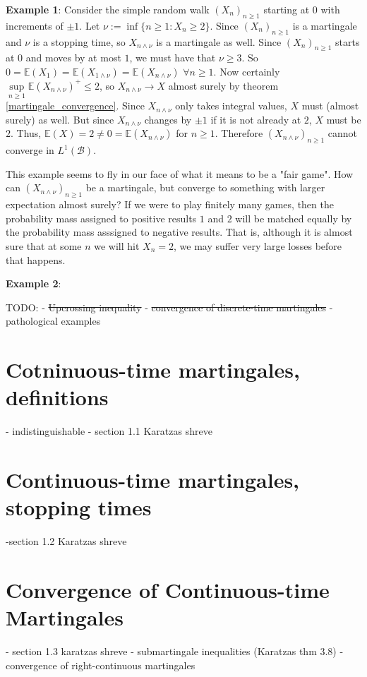 \textbf{Example 1}: Consider the simple random walk $(X_n)_{n \geq 1}$ starting at \(0\) with increments of \(\pm 1\). Let \(\nu := \inf\limits \{n \geq 1 : X_{n} \geq 2\}\). Since \((X_n)_{n \geq 1}\) is a martingale and \(\nu\) is a stopping time, so \(X_{n \wedge \nu}\) is a martingale as well. Since \((X_n)_{n \geq 1}\) starts at \(0\) and moves by at most \(1\), we must have that \(\nu \geq 3\). So \(0 = \mathbb{E}(X_{1}) = \mathbb{E}(X_{1 \wedge \nu}) = \mathbb{E}(X_{n \wedge \nu})\) \(\forall n \geq 1\). Now certainly \(\sup\limits_{n \geq 1} \mathbb{E}(X_{n \wedge \nu})^{+} \leq 2\), so \(X_{n \wedge \nu} \to X\) almost surely by theorem \ref{martingale_convergence}. Since \(X_{n \wedge \nu}\) only takes integral values, \(X\) must (almost surely) as well. But since \(X_{n \wedge \nu}\) changes by \(\pm 1\) if it is not already at \(2\), \(X\) must be \(2\). Thus, \(\mathbb{E}(X) = 2 \neq 0 = \mathbb{E}(X_{n \wedge \nu})\) for \(n \geq 1\). Therefore \((X_{n \wedge \nu})_{n \geq 1}\) cannot converge in \(L^{1}(\mathcal{B})\).

This example seems to fly in our face of what it means to be a "fair game". How can \((X_{n \wedge \nu})_{n \geq 1}\) be a martingale, but converge to something with larger expectation almost surely? If we were to play finitely many games, then the probability mass assigned to positive results \(1\) and \(2\) will be matched equally by the probability mass asssigned to negative results. That is, although it is almost sure that at some \(n\) we will hit \(X_{n} = 2\), we may suffer very large losses before that happens. 

\textbf{Example 2}:

TODO:
- \st{Upcrossing inequality}
- \st{convergence of discrete-time martingales}
- pathological examples

\section{Cotninuous-time martingales, definitions}
- indistinguishable
- section 1.1 Karatzas shreve

\section{Continuous-time martingales, stopping times}
-section 1.2 Karatzas shreve

\section{Convergence of Continuous-time Martingales}
- section 1.3 karatzas shreve
- submartingale inequalities (Karatzas thm 3.8)
- convergence of right-continuous martingales